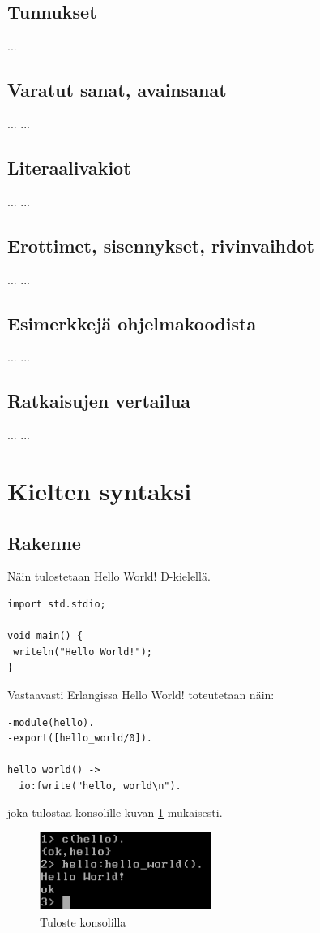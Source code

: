 \documentclass[11pt,oneside,a4paper]{article}
\begin{document}
\subsection{Tunnukset}
...
\subsection{Varatut sanat, avainsanat}
...
...
\subsection{Literaalivakiot}
...
...
\subsection{Erottimet, sisennykset, rivinvaihdot}
...
...
\subsection{Esimerkkejä ohjelmakoodista}
...
...
\subsection{Ratkaisujen vertailua}
...
...
\section{Kielten syntaksi}
\subsection{Rakenne}
Näin tulostetaan Hello World! D-kielellä.
\begin{verbatim}
import std.stdio;

void main() {
 writeln("Hello World!");
}
\end{verbatim}

Vastaavasti Erlangissa Hello World! toteutetaan näin:
\begin{verbatim}
-module(hello).
-export([hello_world/0]).

hello_world() -> 
  io:fwrite("hello, world\n").
\end{verbatim}
joka tulostaa konsolille kuvan \ref{konsoli2} mukaisesti.

\begin{figure}[tbh]
\includegraphics[width=0.5\textwidth]{konsoli2.png}
\caption{Tuloste konsolilla}
\label{konsoli2}
\end{figure}
\end{document}
